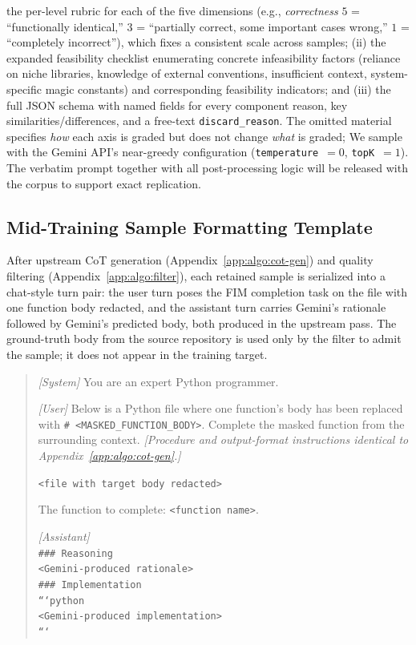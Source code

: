 the per-level rubric for each of the five dimensions (e.g.,
\emph{correctness} $5$ = ``functionally identical,'' $3$ = ``partially
correct, some important cases wrong,'' $1$ = ``completely
incorrect''), which fixes a consistent scale across samples; (ii) the
expanded feasibility checklist enumerating concrete infeasibility
factors (reliance on niche libraries, knowledge of external
conventions, insufficient context, system-specific magic constants)
and corresponding feasibility indicators; and (iii) the full JSON
schema with named fields for every component reason, key
similarities/differences, and a free-text \texttt{discard\_reason}.
The omitted material specifies \emph{how} each axis is graded but
does not change \emph{what} is graded; We sample with the Gemini API's near-greedy configuration
(\texttt{temperature}~$=0$, \texttt{topK}~$=1$). The verbatim prompt together with all post-processing logic
will be released with the corpus to support exact replication.


\subsection{Mid-Training Sample Formatting Template}
\label{app:algo:cot-format}
After upstream CoT generation (Appendix~\ref{app:algo:cot-gen}) and
quality filtering (Appendix~\ref{app:algo:filter}), each retained
sample is serialized into a chat-style turn pair: the user turn poses
the FIM completion task on the file with one function body redacted,
and the assistant turn carries Gemini's rationale followed by
Gemini's predicted body, both produced in the upstream pass. The
ground-truth body from the source repository is used only by the
filter to admit the sample; it does not appear in the training
target.
\begin{quote}\small
\textit{[System]} You are an expert Python programmer.

\noindent\textit{[User]} Below is a Python file where one function's
body has been replaced with \texttt{\# <MASKED\_FUNCTION\_BODY>}.
Complete the masked function from the surrounding context.
\noindent\textit{[Procedure and output-format instructions identical
to Appendix~\ref{app:algo:cot-gen}.]}

\noindent\texttt{<file with target body redacted>}

\noindent The function to complete: \texttt{<function name>}.

\noindent\textit{[Assistant]}\\
\texttt{\#\#\# Reasoning}\\
\texttt{<Gemini-produced rationale>}\\
\texttt{\#\#\# Implementation}\\
\texttt{```python}\\
\texttt{<Gemini-produced implementation>}\\
\texttt{```}
\end{quote}


